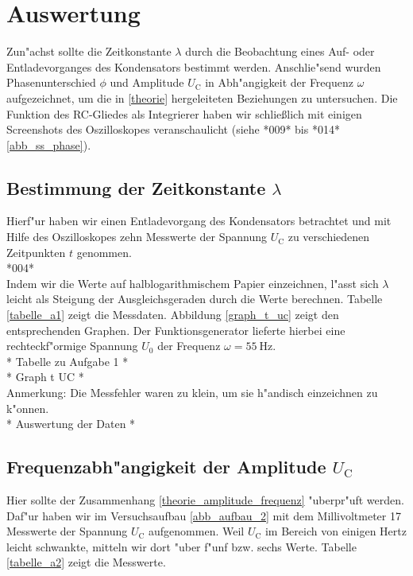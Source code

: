 \documentclass{scrartcl}
\begin{document}
	\section{Auswertung}

		Zun"achst sollte die Zeitkonstante $\lambda$ durch die Beobachtung eines Auf- oder Entladevorganges des Kondensators bestimmt werden.
		Anschlie"send wurden Phasenunterschied $\phi$ und Amplitude $U_{\mathrm{C}}$ in Abh"angigkeit der Frequenz $\omega$ aufgezeichnet, um die in \ref{theorie} hergeleiteten Beziehungen zu untersuchen.
		Die Funktion des RC-Gliedes als Integrierer haben wir schließlich mit einigen Screenshots des Oszilloskopes veranschaulicht (siehe *009* bis *014*\ref{abb_ss_phase}).

		\subsection{Bestimmung der Zeitkonstante $\lambda$}

			Hierf"ur haben wir einen Entladevorgang des Kondensators betrachtet und mit Hilfe des Oszilloskopes
			zehn Messwerte der Spannung $U_{\mathrm{C}}$ zu verschiedenen Zeitpunkten $t$ genommen.\\

			*004*\\

			Indem wir die Werte auf halblogarithmischem Papier einzeichnen, l"asst sich $\lambda$ leicht als Steigung der Ausgleichsgeraden durch die Werte berechnen.
			Tabelle \ref{tabelle_a1} zeigt die Messdaten.
			Abbildung \ref{graph_t_uc} zeigt den entsprechenden Graphen. Der Funktionsgenerator lieferte hierbei eine rechteckf"ormige Spannung $U_0$ der Frequenz $\omega = \SI{55}{\hertz}$.\\

			* Tabelle zu Aufgabe 1 * \\

			* Graph t UC * \\

			Anmerkung: Die Messfehler waren zu klein, um sie h"andisch einzeichnen zu k"onnen.\\

			* Auswertung der Daten *

		\subsection{Frequenzabh"angigkeit der Amplitude $U_{\mathrm{C}}$}

			Hier sollte der Zusammenhang \ref{theorie_amplitude_frequenz} "uberpr"uft werden.
			Daf"ur haben wir im Versuchsaufbau \ref{abb_aufbau_2} mit dem Millivoltmeter 17 Messwerte der Spannung $U_{\mathrm{C}}$ aufgenommen.
			Weil $U_{\mathrm{C}}$ im Bereich von einigen Hertz leicht schwankte,
			mitteln wir dort "uber f"unf bzw. sechs Werte.
			Tabelle \ref{tabelle_a2} zeigt die Messwerte.\\
\end{document}
